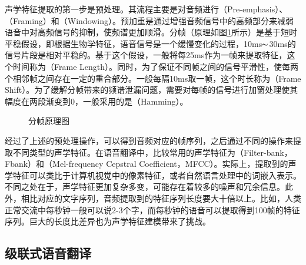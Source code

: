 \parinterval 声学特征提取的第一步是预处理。其流程主要是对音频进行{\small{}}（Pre-emphasis）、{\small{}}（Framing）和{\small{}}（Windowing）。预加重是通过增强音频信号中的高频部分来减弱语音中对高频信号的抑制，使频谱更加顺滑。分帧（原理如图\ref{fig:17-3}所示）是基于短时平稳假设，即根据生物学特征，语音信号是一个缓慢变化的过程，10ms$\thicksim$30ms的信号片段是相对平稳的。基于这个假设，一般将每25ms作为一帧来提取特征，这个时间称为{\small{}}（Frame Length）。同时，为了保证不同帧之间的信号平滑性，使每两个相邻帧之间存在一定的重合部分。一般每隔10ms取一帧，这个时长称为{\small{}}（Frame Shift）。为了缓解分帧带来的频谱泄漏问题，需要对每帧的信号进行加窗处理使其幅度在两段渐变到0，一般采用的是{\small{}}（Hamming）。
\begin{figure}[htp]
\centering

\caption{分帧原理图}
\label{fig:17-3}
\end{figure}

\parinterval 经过了上述的预处理操作，可以得到音频对应的帧序列，之后通过不同的操作来提取不同类型的声学特征。在语音翻译中，比较常用的声学特征为{\small{}}（Filter-bank，Fbank）和{\small{}}（Mel-frequency Cepstral Coefficient，MFCC）。实际上，提取到的声学特征可以类比于计算机视觉中的像素特征，或者自然语言处理中的词嵌入表示。不同之处在于，声学特征更加复杂多变，可能存在着较多的噪声和冗余信息。此外，相比对应的文字序列，音频提取到的特征序列长度要大十倍以上。比如，人类正常交流中每秒钟一般可以说2-3个字，而每秒钟的语音可以提取得到100帧的特征序列。巨大的长度比差异也为声学特征建模带来了挑战。


\subsection{级联式语音翻译}
\label{sec:cascaded-speech-translation}

